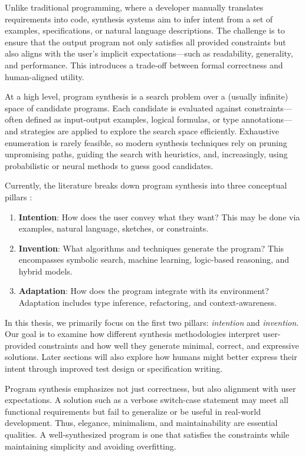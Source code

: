 \indent\indent Unlike traditional programming, where a developer manually translates requirements into code, synthesis systems aim to infer intent from a set of examples, specifications, or natural language descriptions. The challenge is to ensure that the output program not only satisfies all provided constraints but also aligns with the user's implicit expectations—such as readability, generality, and performance. This introduces a trade-off between formal correctness and human-aligned utility.

\indent\indent At a high level, program synthesis is a search problem over a (usually infinite) space of candidate programs. Each candidate is evaluated against constraints—often defined as input-output examples, logical formulas, or type annotations—and strategies are applied to explore the search space efficiently. Exhaustive enumeration is rarely feasible, so modern synthesis techniques rely on pruning unpromising paths, guiding the search with heuristics, and, increasingly, using probabilistic or neural methods to guess good candidates.

\indent\indent Currently, the literature breaks down program synthesis into three conceptual pillars \cite{gottschlich_2018_the}:

\begin{enumerate}
\item \textbf{Intention}: How does the user convey what they want? This may be done via examples, natural language, sketches, or constraints.
\item \textbf{Invention}: What algorithms and techniques generate the program? This encompasses symbolic search, machine learning, logic-based reasoning, and hybrid models.
\item \textbf{Adaptation}: How does the program integrate with its environment? Adaptation includes type inference, refactoring, and context-awareness.
\end{enumerate}

\indent\indent In this thesis, we primarily focus on the first two pillars: \textit{intention} and \textit{invention}. Our goal is to examine how different synthesis methodologies interpret user-provided constraints and how well they generate minimal, correct, and expressive solutions. Later sections will also explore how humans might better express their intent through improved test design or specification writing.

\indent\indent Program synthesis emphasizes not just correctness, but also alignment with user expectations. A solution such as a verbose switch-case statement may meet all functional requirements but fail to generalize or be useful in real-world development. Thus, elegance, minimalism, and maintainability are essential qualities. A well-synthesized program is one that satisfies the constraints while maintaining simplicity and avoiding overfitting.

